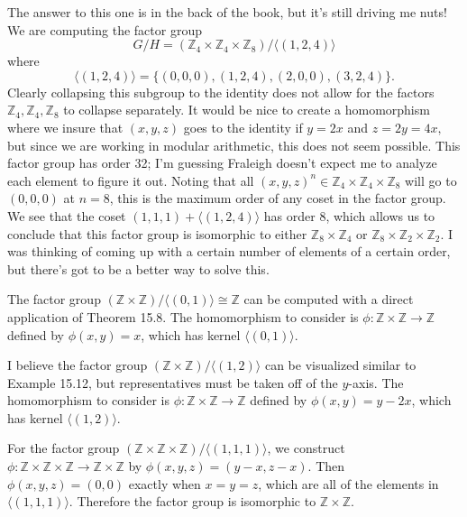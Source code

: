 \documentclass{article}
\newenvironment{problem1}[1]{\noindent {\bf Problem #1:}}
{\medskip}
\begin{document}
\begin{problem1}{5} The answer to this one is in the back of the book, but it's still driving me nuts! We are computing the factor group $$G/H=(\mathbb{Z}_4\times\mathbb{Z}_4\times\mathbb{Z}_8)/\langle(1,2,4)\rangle$$ where $$\langle(1,2,4)\rangle=\{(0,0,0),(1,2,4),(2,0,0),(3,2,4)\}.$$ Clearly collapsing this subgroup to the identity does not allow for the factors $\mathbb{Z}_4,\mathbb{Z}_4, \mathbb{Z}_8$ to collapse separately. It would be nice to create a homomorphism where we insure that $(x,y,z)$ goes to the identity if $y=2x$ and $z=2y=4x,$ but since we are working in modular arithmetic, this does not seem possible. This factor group has order 32; I'm guessing Fraleigh doesn't expect me to analyze each element to figure it out. Noting that all $(x,y,z)^n\in\mathbb{Z}_4\times\mathbb{Z}_4\times\mathbb{Z}_8$ will go to $(0,0,0)$ at $n=8$, this is the maximum order of any coset in the factor group. We see that the coset $(1,1,1)+\langle(1,2,4)\rangle$ has order 8, which allows us to conclude that this factor group is isomorphic to either $\mathbb{Z}_8\times\mathbb{Z}_4$ or $\mathbb{Z}_8\times\mathbb{Z}_2\times\mathbb{Z}_2$. I was thinking of coming up with a certain number of elements of a certain order, but there's got to be a better way to solve this.


\end{problem1}

\begin{problem1}{6} The factor group $(\mathbb{Z}\times\mathbb{Z})/\langle(0,1)\rangle\cong\mathbb{Z}$ can be computed with a direct application of Theorem 15.8. The homomorphism to consider is $\phi:\mathbb{Z}\times\mathbb{Z}\to\mathbb{Z}$ defined by $\phi(x,y)=x$, which has kernel $\langle (0,1)\rangle$.\end{problem1}

\begin{problem1}{7} I believe the factor group $(\mathbb{Z}\times\mathbb{Z})/\langle(1,2)\rangle$ can be visualized similar to Example 15.12, but representatives must be taken off of the $y$-axis. The homomorphism to consider is $\phi:\mathbb{Z}\times\mathbb{Z}\to\mathbb{Z}$ defined by $\phi(x,y)=y-2x$, which has kernel $\langle (1,2)\rangle$.\end{problem1}

\begin{problem1}{8} For the factor group $(\mathbb{Z}\times\mathbb{Z}\times\mathbb{Z})/\langle(1,1,1)\rangle$, we construct $\phi:\mathbb{Z}\times\mathbb{Z}\times\mathbb{Z}\to\mathbb{Z}\times\mathbb{Z}$ by $\phi(x,y,z)=(y-x,z-x)$. Then $\phi(x,y,z)=(0,0)$ exactly when $x=y=z$, which are all of the elements in $\langle(1,1,1)\rangle$. Therefore the factor group is isomorphic to $\mathbb{Z}\times\mathbb{Z}$.
\end{problem1}
\end{document}
